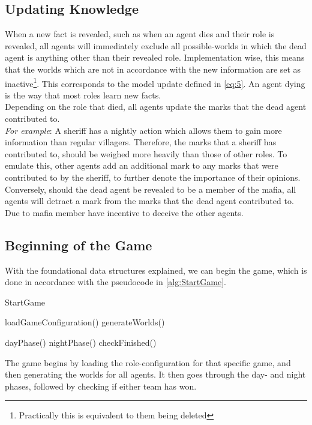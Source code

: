 \subsection{Updating Knowledge}\label{sec:UpdatingKnowledge}
When a new fact is revealed, such as when an agent dies and their role is
revealed, all agents will immediately exclude all possible-worlds in which the
dead agent is anything other than their revealed role. Implementation wise,
this means that the worlds which are not in accordance with the new information
are set as inactive\footnote{Practically this is equivalent to them being
	deleted}. This corresponds to the model update defined in \cref{eq:5}. An agent
dying is the way that most roles learn new facts. \\ Depending on the role that
died, all agents update the marks that the dead agent contributed to.\\
\textit{For example}: A sheriff has a nightly action which allows them to gain
more information than regular villagers. Therefore, the marks that a sheriff
has contributed to, should be weighed more heavily than those of other roles.
To emulate this, other agents add an additional mark to any marks that were
contributed to by the sheriff, to further denote the importance of their
opinions. \\ Conversely, should the dead agent be revealed to be a member of
the mafia, all agents will detract a mark from the marks that the dead agent
contributed to. Due to mafia member have incentive to deceive the other agents.

\subsection{Beginning of the Game}\label{sec:beginningOfTheGame}
With the foundational data structures explained, we can begin the game, which
is done in accordance with the pseudocode in \cref{alg:StartGame}.
\begin{algorithm}[H]
	\caption{StartGame}
	\begin{algorithmic}[1]
		\State loadGameConfiguration()
		\State generateWorlds()

		\State dayPhase()
		\State nightPhase()
		\State checkFinished()
		\EndWhile
		\EndFunction
	\end{algorithmic}\label{alg:StartGame}
\end{algorithm}
\setcounter{algorithmcaption}{0}
The game begins by loading the role-configuration for that specific game, and
then generating the worlds for all agents. It then goes through the day- and
night phases, followed by checking if either team has won.

